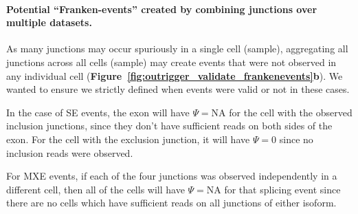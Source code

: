 \paragraph{Potential ``Franken-events'' created by combining junctions over multiple datasets.} As many junctions may occur spuriously in a single cell (sample), aggregating all junctions across all cells (sample) may create events that were not observed in any individual cell (\textbf{Figure~\ref{fig:outrigger_validate_frankenevents}b}). We wanted to ensure we strictly defined when events were valid or not in these cases.

In the case of SE events, the exon will have $\Psi = \text{NA}$ for the cell with the observed inclusion junctions, since they don't have sufficient reads on both sides of the exon. For the cell with the exclusion junction, it will have $\Psi = 0$ since no inclusion reads were observed.

For MXE events, if each of the four junctions was observed independently in a different cell, then all of the cells will have $\Psi = \text{NA}$ for that splicing event since there are no cells which have sufficient reads on all junctions of either isoform.

